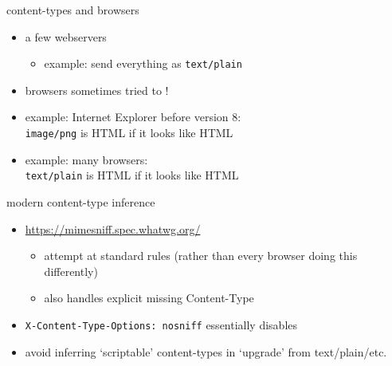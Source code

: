 \begin{frame}{content-types and browsers}
    \begin{itemize}
    \item a few webservers 
        \begin{itemize}
            \item example: send everything as \texttt{text/plain}
        \end{itemize}
    \item browsers sometimes tried to !
    \item example: Internet Explorer before version 8: \\
        \texttt{image/png} is HTML if it looks like HTML
    \item example: many browsers: \\
        \texttt{text/plain} is HTML if it looks like HTML
    \end{itemize}
\end{frame}

\begin{frame}{modern content-type inference}
    \begin{itemize}
    \item \url{https://mimesniff.spec.whatwg.org/}
        \begin{itemize}
        \item attempt at standard rules (rather than every browser doing this differently)
        \item also handles explicit missing Content-Type
        \end{itemize}
    \item \texttt{X-Content-Type-Options: nosniff} essentially disables
    \item avoid inferring `scriptable' content-types in `upgrade' from text/plain/etc.
    \end{itemize}
\end{frame}
